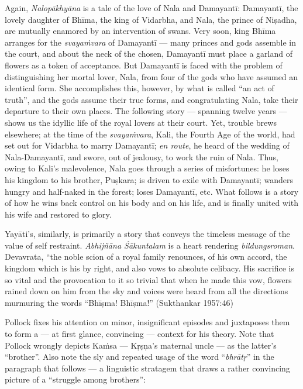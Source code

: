Again, {\sl Nalopākhyāna} is a tale of the love of Nala and Damayantī: Damayantī, the lovely daughter of Bhīma, the king of Vidarbha, and Nala, the prince of Niṣadha, are mutually enamored by an intervention of swans. Very soon, king Bhīma arranges for the {\sl svayaṁvara} of Damayantī --- many princes and gods assemble in the court, and about the neck of the chosen, Damayantī must place a garland of flowers as a token of acceptance. But Damayantī is faced with the problem of distinguishing her mortal lover, Nala, from four of the gods who have assumed an identical form. She accomplishes this, however, by what is called “an act of truth”, and the gods assume their true forms, and congratulating Nala, take their departure to their own places. The following story --- spanning twelve years --- shows us the idyllic life of the royal lovers at their court. Yet, trouble brews elsewhere; at the time of the {\sl svayaṁvara}, Kali, the Fourth Age of the world, had set out for Vidarbha to marry Damayantī; {\sl en route}, he heard of the wedding of Nala-Damayantī, and swore, out of jealousy, to work the ruin of Nala. Thus, owing to Kali's malevolence, Nala goes through a series of misfortunes: he loses his kingdom to his brother, Puṣkara; is driven to exile with Damayantī; wanders hungry and half-naked in the forest; loses Damayantī, etc. What follows is a story of how he wins back control on his body and on his life, and is finally united with his wife and restored to glory. 

Yayāti’s, similarly, is primarily a story that conveys the timeless message of the value of self restraint. {\sl Abhijñāna Śākuntalam} is a heart rendering {\sl bildungsroman}. Devavrata, “the noble scion of a royal family renounces, of his own accord, the kingdom which is his by right, and also vows to absolute celibacy. His sacrifice is so vital and the provocation to it so trivial that when he made this vow, flowers rained down on him from the sky and voices were heard from all the directions murmuring the words “Bhīṣma! Bhīṣma!” (Sukthankar 1957:46)

Pollock fixes his attention on minor, insignificant episodes and juxtaposes them to form a --- at first glance, convincing --- context for his theory. Note that Pollock wrongly depicts Kaṁsa --- Kṛṣṇa’s maternal uncle --- as the latter’s “brother”. Also note the sly and repeated usage of the word “{\sl bhrātṛ}” in the paragraph that follows --- a linguistic stratagem that draws a rather convincing picture of a “struggle among brothers”: 

